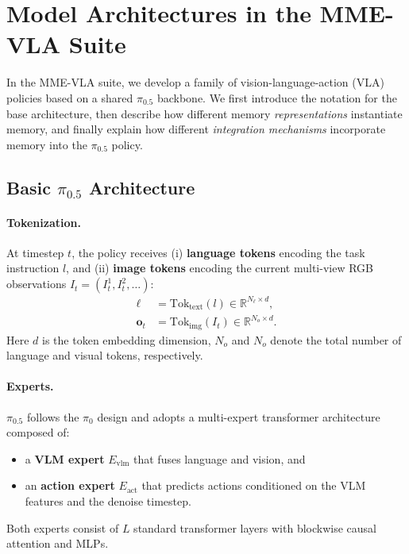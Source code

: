 \clearpage
\section{Model Architectures in the MME-VLA Suite}
\label{sec:appx_model_design}

In the MME-VLA suite, we develop a family of vision-language-action (VLA) policies based on a shared $\pi_{0.5}$ backbone. We first introduce the notation for the base architecture, then describe how different memory \emph{representations} instantiate memory, and finally explain how different \emph{integration mechanisms} incorporate memory into the $\pi_{0.5}$ policy.


\subsection{Basic $\pi_{0.5}$ Architecture}
\label{sec:pi05}
\paragraph{Tokenization.}
At timestep $t$, the policy receives
(i) \textbf{language tokens} encoding the task instruction $l$, and
(ii) \textbf{image tokens} encoding the current multi-view RGB observations
$I_t=(I^{1}_t,I^{2}_t,\dots)$:
\begin{align}
\boldsymbol{\ell} &= \mathrm{Tok}_{\text{text}}(l) \in \mathbb{R}^{N_\ell \times d}, \\
\mathbf{o}_t &= \mathrm{Tok}_{\text{img}}(I_t) \in \mathbb{R}^{N_o \times d}.
\end{align}
Here $d$ is the token embedding dimension, $N_o$ and $N_o$ denote the total number of language and visual tokens, respectively. 

\paragraph{Experts.}
$\pi_{0.5}$ \cite{pi05} follows the $\pi_{0}$ design \cite{pi0} and adopts a multi-expert transformer architecture composed of:
\begin{itemize}
\item a \textbf{VLM expert} $E_{\text{vlm}}$ that fuses language and vision, and
\item an \textbf{action expert} $E_{\text{act}}$ that predicts actions conditioned on the VLM features and the denoise timestep.
\end{itemize}
Both experts consist of $L$ standard transformer layers with blockwise causal attention and MLPs.


